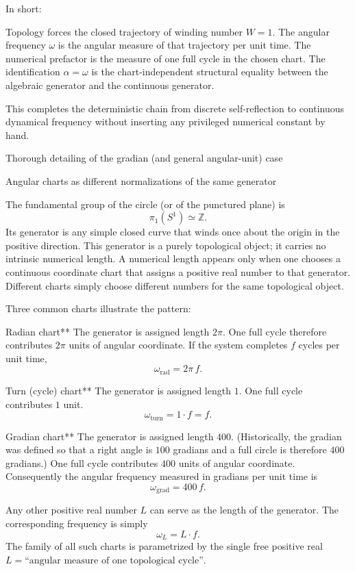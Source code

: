In short:

Topology forces the closed trajectory of winding number \(W=1\).
The angular frequency \(\omega\) is the angular measure of that trajectory per unit time.
The numerical prefactor is the measure of one full cycle in the chosen chart.
The identification \(\alpha=\omega\) is the chart-independent structural equality between the algebraic generator and the continuous generator.

This completes the deterministic chain from discrete self-reflection to continuous dynamical frequency without inserting any privileged numerical constant by hand.

Thorough detailing of the gradian (and general angular-unit) case

Angular charts as different normalizations of the same generator

The fundamental group of the circle (or of the punctured plane) is
\[
\pi_1(S^1)\simeq\mathbb{Z}.
\]
Its generator is any simple closed curve that winds once about the origin in the positive direction. This generator is a purely topological object; it carries no intrinsic numerical length. A numerical length appears only when one chooses a continuous coordinate chart that assigns a positive real number to that generator. Different charts simply choose different numbers for the same topological object.

Three common charts illustrate the pattern:

Radian chart**  
  The generator is assigned length \(2\pi\).  
  One full cycle therefore contributes \(2\pi\) units of angular coordinate.  
  If the system completes \(f\) cycles per unit time,
  \[
  \omega_{\text{rad}}=2\pi\,f.
  \]

Turn (cycle) chart**  
  The generator is assigned length \(1\).  
  One full cycle contributes \(1\) unit.  
  \[
  \omega_{\text{turn}}=1\cdot f=f.
  \]

Gradian chart**  
  The generator is assigned length \(400\).  
  (Historically, the gradian was defined so that a right angle is \(100\) gradians and a full circle is therefore \(400\) gradians.)  
  One full cycle contributes \(400\) units of angular coordinate.  
  Consequently the angular frequency measured in gradians per unit time is
  \[
  \omega_{\text{grad}}=400\,f.
  \]

Any other positive real number \(L\) can serve as the length of the generator. The corresponding frequency is simply
\[
\omega_L=L\cdot f.
\]
The family of all such charts is parametrized by the single free positive real \(L=\text{“angular measure of one topological cycle”}\).

